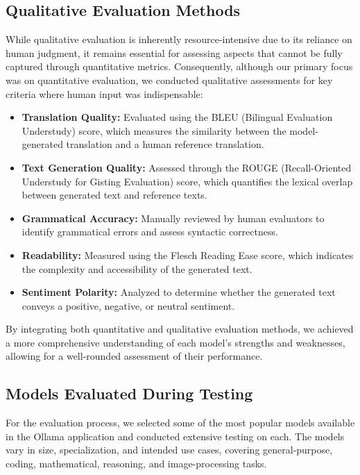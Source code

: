 \subsection{Qualitative Evaluation Methods}

While qualitative evaluation is inherently resource-intensive due to its reliance on human judgment, it remains essential for assessing aspects that cannot be fully captured through quantitative metrics. Consequently, although our primary focus was on quantitative evaluation, we conducted qualitative assessments for key criteria where human input was indispensable:

\begin{itemize}
  \item \textbf{Translation Quality:} Evaluated using the BLEU (Bilingual Evaluation Understudy) score, which measures the similarity between the model-generated translation and a human reference translation. \cite{score-blue}
  \item \textbf{Text Generation Quality:} Assessed through the ROUGE (Recall-Oriented Understudy for Gisting Evaluation) score, which quantifies the lexical overlap between generated text and reference texts.
  \item \textbf{Grammatical Accuracy:} Manually reviewed by human evaluators to identify grammatical errors and assess syntactic correctness.
  \item \textbf{Readability:} Measured using the Flesch Reading Ease score, which indicates the complexity and accessibility of the generated text.
  \item \textbf{Sentiment Polarity:} Analyzed to determine whether the generated text conveys a positive, negative, or neutral sentiment.
\end{itemize}

\cite{score-bl-rouge}

By integrating both quantitative and qualitative evaluation methods, we achieved a more comprehensive understanding of each model’s strengths and weaknesses, allowing for a well-rounded assessment of their performance.

\subsection{Models Evaluated During Testing}

For the evaluation process, we selected some of the most popular models available in the Ollama application and conducted extensive testing on each. 
The models vary in size, specialization, and intended use cases, covering general-purpose, coding, mathematical, reasoning, and image-processing tasks.

